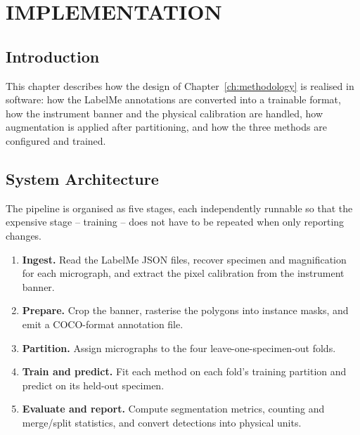 \chapter{IMPLEMENTATION}
\label{ch:implementation}

\section{Introduction}

This chapter describes how the design of Chapter~\ref{ch:methodology} is realised in
software: how the LabelMe annotations are converted into a trainable format, how the
instrument banner and the physical calibration are handled, how augmentation is
applied after partitioning, and how the three methods are configured and trained.


\section{System Architecture}

The pipeline is organised as five stages, each independently runnable so that the
expensive stage -- training -- does not have to be repeated when only reporting
changes.

\begin{enumerate}
    \item \textbf{Ingest.} Read the LabelMe JSON files, recover specimen and
    magnification for each micrograph, and extract the pixel calibration from the
    instrument banner.
    \item \textbf{Prepare.} Crop the banner, rasterise the polygons into instance
    masks, and emit a COCO-format annotation file.
    \item \textbf{Partition.} Assign micrographs to the four leave-one-specimen-out
    folds.
    \item \textbf{Train and predict.} Fit each method on each fold's training
    partition and predict on its held-out specimen.
    \item \textbf{Evaluate and report.} Compute segmentation metrics, counting and
    merge/split statistics, and convert detections into physical units.
\end{enumerate}

